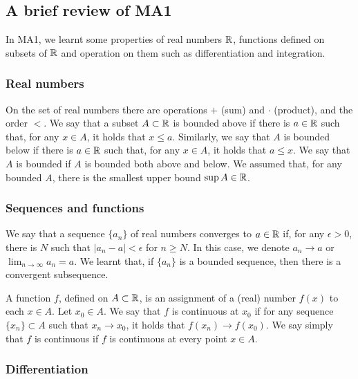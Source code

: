 \subsection*{A brief review of MA1}
In MA1, we learnt some properties of real numbers $\mathbb{R}$, functions defined on subsets of $\mathbb{R}$
and operation on them such as differentiation and integration.

\subsubsection*{Real numbers}
On the set of real numbers there are operations $+$ (sum) and $\cdot$ (product), and the order $<$.
We say that a subset $A \subset \mathbb{R}$ is bounded above if there is $a \in \mathbb{R}$ such that,
for any $x \in A$, it holds that $x \le a$. Similarly, we say that $A$ is bounded below if there is $a \in \mathbb{R}$
such that, for any $x \in A$, it holds that $a \le x$. We say that $A$ is bounded if $A$ is bounded both above and below.
We assumed that, for any bounded $A$, there is the smallest upper bound $\sup A \in \mathbb{R}$.

\subsubsection*{Sequences and functions}

We say that a sequence $\{a_n\}$ of real numbers converges to $a \in \mathbb{R}$ if, for any $\epsilon > 0$,
there is $N$ such that $|a_n - a| < \epsilon$ for $n \ge N$. In this case, we denote $a_n \to a$ or $\lim_{n\to \infty}a_n = a$.
We learnt that, if $\{a_n\}$ is a bounded sequence, then there is a convergent subsequence.

A function $f$, defined on $A \subset \mathbb{R}$, is an assignment of a (real) number $f(x)$ to each $x \in A$.
Let $x_0 \in A$. We say that $f$ is continuous at $x_0$ if for any sequence $\{x_n\} \subset A$ such that $x_n \to x_0$,
it holds that $f(x_n) \to f(x_0)$. We say simply that $f$ is continuous if $f$ is continuous at every point $x \in A$.

\subsubsection*{Differentiation}

